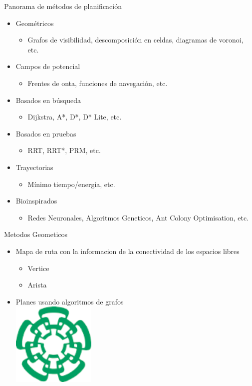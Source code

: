 \documentclass[
	11pt, %
]{beamer}
\begin{document}
\begin{frame}{Panorama de m\'{e}todos de planificaci\'{o}n}
  \begin{itemize}
  \item Geom\'{e}tricos
    \begin{itemize}
    \item Grafos de visibilidad, descomposici\'{o}n en celdas, diagramas de voronoi, etc.
    \end{itemize}
  \item Campos de potencial
    \begin{itemize}
    \item Frentes de onta, funciones de navegaci\'{o}n, etc.
    \end{itemize}
  \item Basados en b\'{u}squeda
    \begin{itemize}
    \item Dijkstra, A*, D*, D* Lite, etc.
    \end{itemize}
  \item Basados en pruebas
    \begin{itemize}
    \item RRT, RRT*, PRM, etc.
    \end{itemize}
  \item Trayectorias
    \begin{itemize}
    \item M\'{i}nimo tiempo/energia, etc.
    \end{itemize}
  \item Bioinspirados
    \begin{itemize}
    \item Redes Neuronales, Algoritmos Geneticos, Ant Colony Optimisation, etc.
    \end{itemize}
  \end{itemize}
\end{frame}

\begin{frame}{Metodos Geometicos}
  \begin{itemize}
  \item Mapa de ruta con la informacion de la conectividad de los espacios libres\\
    \begin{itemize}
    \item Vertice
    \item Arista
    \end{itemize}
  \item Planes usando algoritmos de grafos\\
    \centering
    \includegraphics[angle=45,width=4cm]{cinvestavlogo}
  \end{itemize}
\end{frame}
\end{document}
